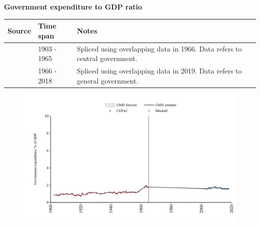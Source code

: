 \documentclass[12pt,a4paper,landscape]{article}
\begin{document}
\begin{adjustbox}{max totalsize={\paperwidth}{\paperheight},center}
\begin{minipage}[t][\textheight][t]{\textwidth}
\vspace*{0.5cm}
{}
\begin{center}
{\Large\bfseries Government expenditure to GDP ratio}
\end{center}
\vspace{0.5cm}
\begin{table}[H]
\centering
\small
\begin{tabular}{|l|l|l|}
\hline
\textbf{Source} & \textbf{Time span} & \textbf{Notes} \\
\hline
\rowcolor{white}\cite{Mitchell}& 1903 - 1965 &Spliced using overlapping data in 1966. Data refers to central government.\\
\rowcolor{lightgray}\cite{CEPAC}& 1966 - 2018 &Spliced using overlapping data in 2019. Data refers to general government.\\
\hline
\end{tabular}
\end{table}
\begin{figure}[H]
\centering
\includegraphics[width=\textwidth,height=0.6\textheight,keepaspectratio]{graphs/CUB_govexp_GDP.pdf}
\end{figure}
\end{minipage}
\end{adjustbox}
\end{document}

